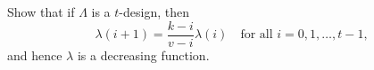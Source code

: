 Show that if $\Lambda$ is a $t$-design, then
$$\lambda(i + 1) = \frac{k - i}{v - i} \lambda(i) \quad \text{for all } i = 0, 1, \ldots, t - 1,$$
and hence $\lambda$ is a decreasing function.
